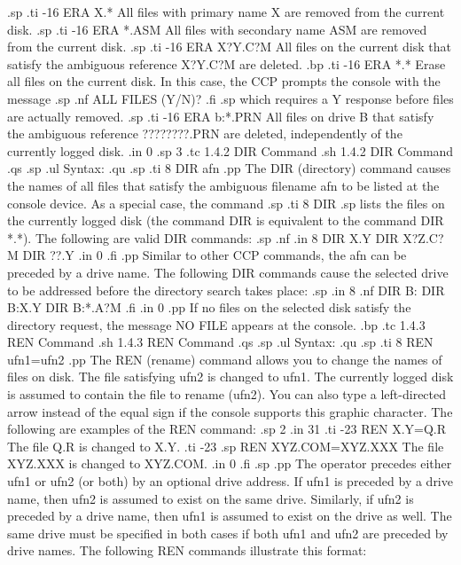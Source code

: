 .sp
.ti -16
ERA X.*         All files with primary name X are removed from the current 
disk.
.sp
.ti -16
ERA *.ASM       All files with secondary name ASM are removed from the 
current disk.
.sp
.ti -16
ERA X?Y.C?M     All files on the current disk that satisfy the ambiguous 
reference X?Y.C?M are deleted.
.bp
.ti -16
ERA *.*         Erase all files on the current disk.  In this 
case, the CCP prompts the console with the message
.sp
.nf
ALL FILES (Y/N)?
.fi
.sp
which requires a Y response before files are actually removed.
.sp
.ti -16
ERA b:*.PRN     All files on drive B that satisfy the ambiguous 
reference ????????.PRN are deleted, independently of the currently 
logged disk.
.in 0
.sp 3
.tc         1.4.2  DIR Command
.sh
1.4.2  DIR Command
.qs
.sp
.ul
Syntax:
.qu
.sp
.ti 8
DIR afn
.pp
The DIR (directory) command causes the names of all files that satisfy the 
ambiguous filename afn to be listed at the console device.  As a special 
case, the command
.sp
.ti 8
DIR
.sp
lists the files on the currently logged disk (the command DIR is 
equivalent to the command DIR *.*).  The following are valid DIR 
commands:
.sp
.nf
.in 8
DIR X.Y
DIR X?Z.C?M
DIR ??.Y
.in 0
.fi
.pp
Similar to other CCP commands, the afn can be preceded by a drive name.  
The following DIR commands cause the selected drive to be addressed before 
the directory search takes place:
.sp
.in 8
.nf
DIR B:
DIR B:X.Y
DIR B:*.A?M
.fi
.in 0
.pp
If no files on the selected disk satisfy the directory request, the 
message NO FILE appears at the console.
.bp
.tc         1.4.3  REN Command 
.sh
1.4.3  REN Command
.qs
.sp
.ul
Syntax:
.qu
.sp
.ti 8
REN ufn1=ufn2
.pp
The REN (rename) command allows you to change the names of files on 
disk.  The file satisfying ufn2 is changed to ufn1.  The currently logged 
disk is assumed to contain the file to rename (ufn2).  You can also 
type a left-directed arrow instead of the equal sign if the console supports 
this graphic character.  The following are examples of the REN 
command:
.sp 2
.in 31
.ti -23
REN X.Y=Q.R            The file Q.R is changed to X.Y.
.ti -23
.sp
REN XYZ.COM=XYZ.XXX    The file XYZ.XXX is changed to XYZ.COM.
.in 0
.fi
.sp
.pp
The operator precedes either ufn1 or ufn2 (or both) by an optional drive 
address.  If ufn1 is preceded by a drive name, then ufn2 is assumed to exist 
on the same drive.  Similarly, if ufn2 is preceded by a drive name, then 
ufn1 is assumed to exist on the drive as well.  The same drive must be 
specified in both cases if both ufn1 and ufn2 are preceded by drive names.  
The following REN commands illustrate this format:
